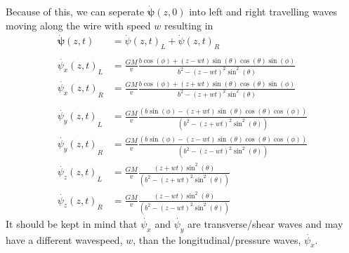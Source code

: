 \documentclass{report}
\begin{document}
Because of this, we can seperate $\mathbf{\dot\psi}(z,0)$ into left and right travelling waves moving along the wire with speed $w$ resulting in
\begin{align}
    \mathbf{\dot{\psi}} (z, t) &= {\dot{\psi} (z, t)}_L + {\dot{\psi} (z, t)}_R \label{eqn:velocity pulse}\\
    \nonumber\\
    \nonumber {\dot{\psi_x} (z, t)}_L &= \frac{G M}{v} \frac{b \cos (\phi )+ (z - w t) \sin (\theta ) \cos (\theta ) \sin (\phi )}{b^2-{(z - w t)}^2 \sin ^2(\theta )}\\
    \nonumber {\dot{\psi_x} (z, t)}_R &= \frac{G M}{v} \frac{b \cos (\phi )+ (z + w t) \sin (\theta ) \cos (\theta ) \sin (\phi )}{b^2-{(z + w t)}^2 \sin ^2(\theta )}\\
    \nonumber\\
    \nonumber {\dot{\psi_y} (z, t)}_L &= \frac{G M}{v} \frac{(b \sin (\phi )-{(z + w t)} \sin (\theta ) \cos (\theta ) \cos (\phi ))}{\left(b^2-{(z + w t)}^2 \sin ^2(\theta )\right)}\\
    \nonumber {\dot{\psi_y} (z, t)}_R &= \frac{G M}{v} \frac{(b \sin (\phi )-{(z - w t)} \sin (\theta ) \cos (\theta ) \cos (\phi ))}{\left(b^2-{(z - w t)}^2 \sin ^2(\theta )\right)}
    \nonumber\\
    \nonumber {\dot{\psi_z} (z, t)}_L &= \frac{G M}{v} \frac{{(z + w t)} \sin ^2(\theta )}{\left(b^2-{(z + w t)}^2 \sin ^2(\theta )\right)}\\
    \nonumber {\dot{\psi_z} (z, t)}_R &= \frac{G M}{v} \frac{{(z - w t)} \sin ^2(\theta )}{\left(b^2-{(z - w t)}^2 \sin ^2(\theta )\right)}
\end{align}
It should be kept in mind that $\dot{\psi_x}$ and $\dot{\psi_y}$ are transverse/shear waves and may have a different wavespeed, $w$, than the longitudinal/pressure waves, $\dot{\psi_x}$.
\end{document}
